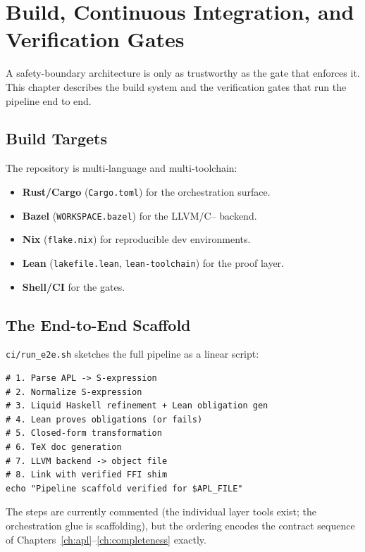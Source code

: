 \chapter{Build, Continuous Integration, and Verification Gates}
\label{ch:build}

A safety-boundary architecture is only as trustworthy as the gate that
enforces it. This chapter describes the build system and the verification
gates that run the pipeline end to end.

\section{Build Targets}
\label{sec:build-targets}

The repository is multi-language and multi-toolchain:
\begin{itemize}
  \item \textbf{Rust/Cargo} (\texttt{Cargo.toml}) for the orchestration
        surface.
  \item \textbf{Bazel} (\texttt{WORKSPACE.bazel}) for the LLVM/C{--} backend.
  \item \textbf{Nix} (\texttt{flake.nix}) for reproducible dev environments.
  \item \textbf{Lean} (\texttt{lakefile.lean}, \texttt{lean-toolchain}) for
        the proof layer.
  \item \textbf{Shell/CI} for the gates.
\end{itemize}

\section{The End-to-End Scaffold}
\label{sec:build-e2e}

\texttt{ci/run\_e2e.sh} sketches the full pipeline as a linear script:
\begin{lstlisting}[language=BashX,caption={End-to-end scaffold (run\_e2e.sh).},label=lst:build-e2e]
# 1. Parse APL -> S-expression
# 2. Normalize S-expression
# 3. Liquid Haskell refinement + Lean obligation gen
# 4. Lean proves obligations (or fails)
# 5. Closed-form transformation
# 6. TeX doc generation
# 7. LLVM backend -> object file
# 8. Link with verified FFI shim
echo "Pipeline scaffold verified for $APL_FILE"
\end{lstlisting}
The steps are currently commented (the individual layer tools exist; the
orchestration glue is scaffolding), but the ordering encodes the contract
sequence of Chapters~\ref{ch:apl}--\ref{ch:completeness} exactly.

